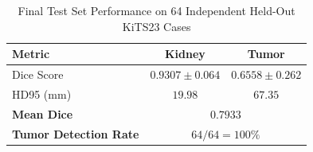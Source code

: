 
\begin{table}[!t]
\caption{Final Test Set Performance on 64 Independent Held-Out KiTS23 Cases}
\label{tab:performance_metrics}
\centering
\begin{tabular}{@{}lcc@{}}
\toprule
\textbf{Metric} & \textbf{Kidney} & \textbf{Tumor} \\
\midrule
Dice Score & $0.9307 \pm 0.064$ & $0.6558 \pm 0.262$ \\
HD95 (mm) & $19.98$ & $67.35$ \\
\midrule
\textbf{Mean Dice} & \multicolumn{2}{c}{$0.7933$} \\
\textbf{Tumor Detection Rate} & \multicolumn{2}{c}{$64/64 = 100\%$} \\
\bottomrule
\end{tabular}
\end{table}
